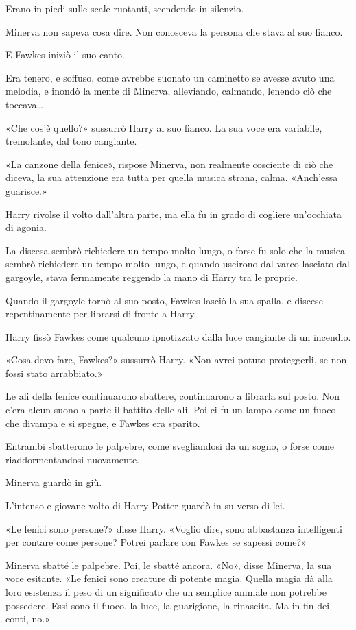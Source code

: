 Erano in piedi sulle scale ruotanti, scendendo in silenzio.

Minerva non sapeva cosa dire. Non conosceva la persona che stava al suo fianco.

E Fawkes iniziò il suo canto.

Era tenero, e soffuso, come avrebbe suonato un caminetto se avesse avuto una melodia, e inondò la mente di Minerva, alleviando, calmando, lenendo ciò che toccava…

«Che cos’è quello?» sussurrò Harry al suo fianco. La sua voce era variabile, tremolante, dal tono cangiante.

«La canzone della fenice», rispose Minerva, non realmente cosciente di ciò che diceva, la sua attenzione era tutta per quella musica strana, calma. «Anch’essa guarisce.»

Harry rivolse il volto dall’altra parte, ma ella fu in grado di cogliere un’occhiata di agonia.

La discesa sembrò richiedere un tempo molto lungo, o forse fu solo che la musica sembrò richiedere un tempo molto lungo, e quando uscirono dal varco lasciato dal gargoyle, stava fermamente reggendo la mano di Harry tra le proprie.

Quando il gargoyle tornò al suo posto, Fawkes lasciò la sua spalla, e discese repentinamente per librarsi di fronte a Harry.

Harry fissò Fawkes come qualcuno ipnotizzato dalla luce cangiante di un incendio.

«Cosa devo fare, Fawkes?» sussurrò Harry. «Non avrei potuto proteggerli, se non fossi stato arrabbiato.»

Le ali della fenice continuarono sbattere, continuarono a librarla sul posto. Non c’era alcun suono a parte il battito delle ali. Poi ci fu un lampo come un fuoco che divampa e si spegne, e Fawkes era sparito.

Entrambi sbatterono le palpebre, come svegliandosi da un sogno, o forse come riaddormentandosi nuovamente.

Minerva guardò in giù.

L’intenso e giovane volto di Harry Potter guardò in su verso di lei.

«Le fenici sono persone?» disse Harry. «Voglio dire, sono abbastanza intelligenti per contare come persone? Potrei parlare con Fawkes se sapessi come?»

Minerva sbatté le palpebre. Poi, le sbatté ancora. «No», disse Minerva, la sua voce esitante. «Le fenici sono creature di potente magia. Quella magia dà alla loro esistenza il peso di un significato che un semplice animale non potrebbe possedere. Essi sono il fuoco, la luce, la guarigione, la rinascita. Ma in fin dei conti, no.»

